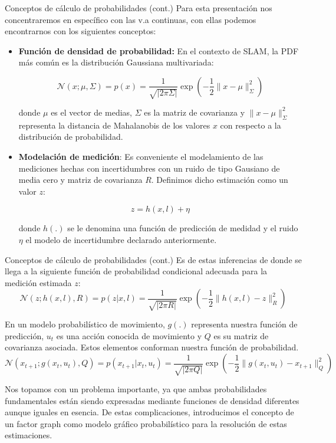 \documentclass[10pt]{beamer}
\begin{document}
        \begin{frame}{Conceptos de cálculo de probabilidades (cont.)}
            Para esta presentación nos concentraremos en específico con las v.a continuas, con ellas podemos encontrarnos con los siguientes conceptos:
            \begin{itemize}
                \item \textbf{Función de densidad de probabilidad:} En el contexto de SLAM, la PDF más común es la distribución Gaussiana multivariada:
                
                \[
                \mathcal{N}(x; \mu, \Sigma) = p(x) = \frac{1}{\sqrt{|2\pi\Sigma|}} \exp\left(-\frac{1}{2}\|x - \mu\|^2_{\Sigma}\right)
                \]
                
                donde $\mu$ es el vector de medias, $\Sigma$ es la matriz de covarianza y $\|x - \mu\|^2_{\Sigma}$ representa la distancia de Mahalanobis de los valores $x$ con respecto a la distribución de probabilidad.

                \item \textbf{Modelación de medición}: Es conveniente el modelamiento de las mediciones hechas con incertidumbres con un ruido de tipo Gausiano de media cero y matriz de covarianza $R$. Definimos
                dicho estimación como un valor $z$:
                
                \[
                z = h(x,l) + \eta
                \]
                
                donde $h(.)$ se le denomina una función de predicción de medidad y el ruido $\eta$ el modelo de incertidumbre declarado anteriormente.
            \end{itemize}
        \end{frame}

        \begin{frame}{Conceptos de cálculo de probabilidades (cont.)}
            Es de estas inferencias de donde se llega a la siguiente función de probabilidad condicional adecuada para la medición estimada $z$:
            \[
            \mathcal{N}(z; h(x, l), R) = p(z | x, l) = \frac{1}{\sqrt{|2\pi R|}} \exp\left(-\frac{1}{2}\|h(x,l) - z\|^2_{R}\right)
            \]

            En un modelo probabilístico de movimiento, $g(.)$ representa nuestra función de predicción, $u_t$ es una acción conocida de movimiento y $Q$ es su matriz de covarianza asociada. Estos elementos conforman nuestra función de probabilidad.        
            \[
            \mathcal{N}(x_{t+1}; g(x_t, u_t), Q) = p(x_{t+1} | x_t, u_t) = \frac{1}{\sqrt{|2\pi Q|}} \exp\left(-\frac{1}{2}\|g(x_t, u_t) - x_{t+1}\|^2_{Q}\right)
            \]

            Nos topamos con un problema importante, ya que ambas probabilidades fundamentales están siendo expresadas mediante funciones de densidad diferentes aunque iguales en esencia. De estas complicaciones, introducimos
            el concepto de un factor graph como modelo gráfico probabilístico para la resolución de estas estimaciones.
        \end{frame}
\end{document}
